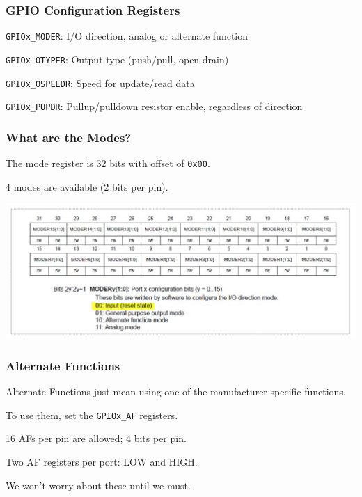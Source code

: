 \begin{frame}
\frametitle{GPIO Configuration Registers}

\texttt{GPIOx\_MODER}: I/O direction, analog or alternate function

\texttt{GPIOx\_OTYPER}: Output type (push/pull, open-drain)

\texttt{GPIOx\_OSPEEDR}: Speed for update/read data

\texttt{GPIOx\_PUPDR}: Pullup/pulldown resistor enable, regardless of direction

\end{frame}


\begin{frame}
\frametitle{What are the Modes?}

The mode register is 32 bits with offset of \texttt{0x00}. 

4 modes are available (2 bits per pin).

\begin{center}
	\includegraphics[width=\textwidth]{images/gpio-moder.png}
\end{center}

\end{frame}


\begin{frame}
\frametitle{Alternate Functions}

Alternate Functions just mean using one of the manufacturer-specific functions.

To use them, set the \texttt{GPIOx\_AF} registers.

16 AFs per pin are allowed; 4 bits per pin.

Two AF registers per port: LOW and HIGH.

We won't worry about these until we must.

\end{frame}


